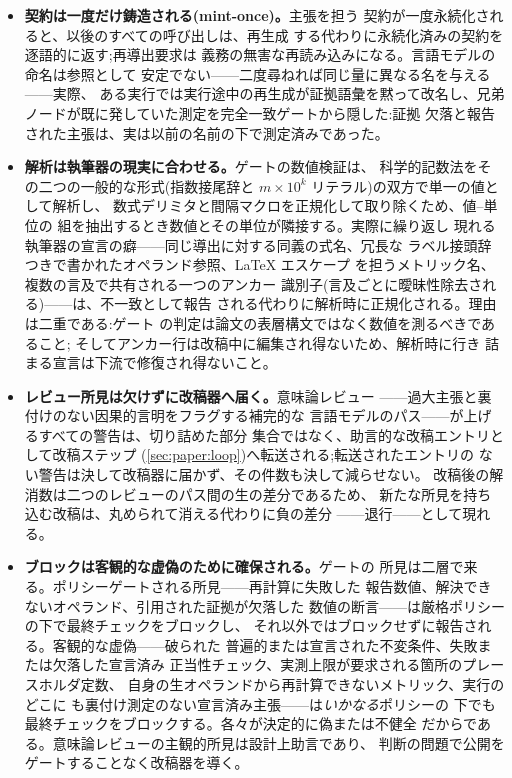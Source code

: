 \begin{itemize}
  \item \textbf{契約は一度だけ鋳造される(mint-once)。}主張を担う
        契約が一度永続化されると、以後のすべての呼び出しは、再生成
        する代わりに永続化済みの契約を逐語的に返す;再導出要求は
        義務の無害な再読み込みになる。言語モデルの命名は参照として
        安定でない——二度尋ねれば同じ量に異なる名を与える——実際、
        ある実行では実行途中の再生成が証拠語彙を黙って改名し、兄弟
        ノードが既に発していた測定を完全一致ゲートから隠した:証拠
        欠落と報告された主張は、実は以前の名前の下で測定済みであった。
  \item \textbf{解析は執筆器の現実に合わせる。}ゲートの数値検証は、
        科学的記数法をその二つの一般的な形式(指数接尾辞と
        $m \times 10^{k}$ リテラル)の双方で単一の値として解析し、
        数式デリミタと間隔マクロを正規化して取り除くため、値--単位の
        組を抽出するとき数値とその単位が隣接する。実際に繰り返し
        現れる執筆器の宣言の癖——同じ導出に対する同義の式名、冗長な
        ラベル接頭辞つきで書かれたオペランド参照、\LaTeX{} エスケープ
        を担うメトリック名、複数の言及で共有される一つのアンカー
        識別子(言及ごとに曖昧性除去される)——は、不一致として報告
        される代わりに解析時に正規化される。理由は二重である:ゲート
        の判定は論文の表層構文ではなく数値を測るべきであること;
        そしてアンカー行は改稿中に編集され得ないため、解析時に行き
        詰まる宣言は下流で修復され得ないこと。
  \item \textbf{レビュー所見は欠けずに改稿器へ届く。}意味論レビュー
        ——過大主張と裏付けのない因果的言明をフラグする補完的な
        言語モデルのパス——が上げるすべての警告は、切り詰めた部分
        集合ではなく、助言的な改稿エントリとして改稿ステップ
        (\cref{sec:paper:loop})へ転送される;転送されたエントリの
        ない警告は決して改稿器に届かず、その件数も決して減らせない。
        改稿後の解消数は二つのレビューのパス間の生の差分であるため、
        新たな所見を持ち込む改稿は、丸められて消える代わりに負の差分
        ——退行——として現れる。
  \item \textbf{ブロックは客観的な虚偽のために確保される。}ゲートの
        所見は二層で来る。ポリシーゲートされる所見——再計算に失敗した
        報告数値、解決できないオペランド、引用された証拠が欠落した
        数値の断言——は厳格ポリシーの下で最終チェックをブロックし、
        それ以外ではブロックせずに報告される。客観的な虚偽——破られた
        普遍的または宣言された不変条件、失敗または欠落した宣言済み
        正当性チェック、実測上限が要求される箇所のプレースホルダ定数、
        自身の生オペランドから再計算できないメトリック、実行のどこに
        も裏付け測定のない宣言済み主張——は\emph{いかなる}ポリシーの
        下でも最終チェックをブロックする。各々が決定的に偽または不健全
        だからである。意味論レビューの主観的所見は設計上助言であり、
        判断の問題で公開をゲートすることなく改稿器を導く。
\end{itemize}

